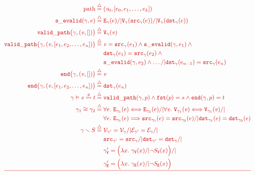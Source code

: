 \documentclass[acmsmall,screen]{acmart}  %
\newcommand{\defeq}{\mathbin{\stackrel{\triangle}{=}}} %
\providecommand{\DIFdel}[1]{{\protect\color{red}\sout{#1}}}                      %
\providecommand{\DIFdelFL}[1]{\DIFdel{#1}} %
\begin{document}
\begin{eqnarray*}
     	\DIFdelFL{\begin{aligned}
    	\mathrm{path} \; \defeq \; &(\m{v}_0, [e_0, e_1, \dots, e_k]) \\ 
    	\mathtt{s\_evalid}(\gamma, e) \; \defeq \; & \mathtt{E}_{\gamma}(e) /| 
    	\mathtt{V}_{\gamma}(\mathtt{src}_{\gamma}(e)) /| 
    	\mathtt{V}_{\gamma}(\mathtt{dst}_{\gamma}(e)) \\
		\mathtt{valid\_path}\big(\gamma, (\m{v},[])\big) \;\defeq \; & \mathtt{V}_{\gamma}(\m{v})\\
		\mathtt{valid\_path}\big(\gamma, (\m{v},[e_1,e_2,\dots,e_n])\big) \; \defeq \; &\m{v}=\mathtt{src}_{\gamma}(e_1) \wedge \mathtt{s\_evalid}(\gamma,e_1) \wedge \null \\
    &\mathtt{dst}_{\gamma}(e_1)=\mathtt{src}_{\gamma}(e_2) \wedge \null\\
    &\mathtt{s\_evalid}(\gamma, e_2) \wedge \dots /| \mathtt{dst}_{\gamma}(e_{n-1})=\mathtt{src}_{\gamma}(e_n) \\ 
        \mathtt{end}\big(\gamma, (\m{v}, [])\big)\;\defeq\;& \m{v}\\
      	\mathtt{end}\big(\gamma, (\m{v},[e_1,e_2,\dots,e_n])\big)\;\defeq\;&
      	\mathtt{dst}_{\gamma}(e_{n})\\
      	\gamma \vDash s \overset{\m{p}}{\leadsto} t \;\defeq\; &
        \mathtt{valid\_path}(\gamma, p)\wedge
        \mathtt{fst}(p)=s \wedge \mathtt{end}(\gamma,p)=t \\
        \gamma_1 \cong \gamma_2 \; \defeq \; & 
        	\forall e.~\mathtt{E}_{\gamma_1}(e) <=> \mathtt{E}_{\gamma_2}(e) /| \forall \m{v}.~\mathtt{V}_{\gamma_1}(\m{v}) <=> \mathtt{V}_{\gamma_1}(\m{v}) /| \null \\
        	&\forall e.~\mathtt{E}_{\gamma_1}(e) ==> \mathtt{src}_{\gamma_1}(e) = \mathtt{src}_{\gamma_2}(e) /| \mathtt{dst}_{\gamma_1}(e) = \mathtt{dst}_{\gamma_2}(e) \\
       	\gamma \smallsetminus S \; \defeq \; 
       	 	&{\mathcal{V}}_{\gamma'} = {\mathcal{V}}_{\gamma} /| 
          {\mathcal{E}}_{\gamma'} = {\mathcal{E}}_{\gamma} /| \null \\
          &{\mathtt{src}}_{\gamma'} = {\mathtt{src}}_{\gamma} /|
          {\mathtt{dst}}_{\gamma'} = {\mathtt{dst}}_{\gamma} /| \null \\
       	 	&\gamma'_{\mathtt{V}} = \Big(\lambda x.~ \gamma_{\mathtt{V}}(x) /| \lnot S_{\mathtt{V}}(x)\Big) /| \null \\ 
       	 	&\gamma'_{\mathtt{E}} = \Big(\lambda x.~ \gamma_{\mathtt{E}}(x) /| \lnot S_{\mathtt{E}}(x)\Big)\\

\end{aligned}}
\end{eqnarray*}
\end{document}
